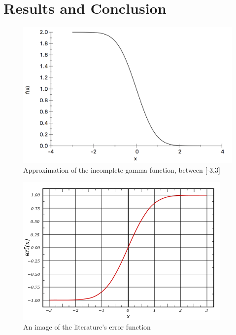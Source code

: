 \documentclass[12pt,letterpaper,notitlepage]{article}
\begin{document}
\section{Results and Conclusion}	
	\begin{figure}[H]
		\includegraphics[width=1.\textwidth]{slide.png}
		\caption{Approximation of the incomplete gamma function, between [-3,3]}
	\end{figure}  
	\begin{figure}[H]
		\includegraphics[width=1.\textwidth]{alsoslide.png}
		\caption{An image of the literature's error function}
	\end{figure}  
\end{document}

